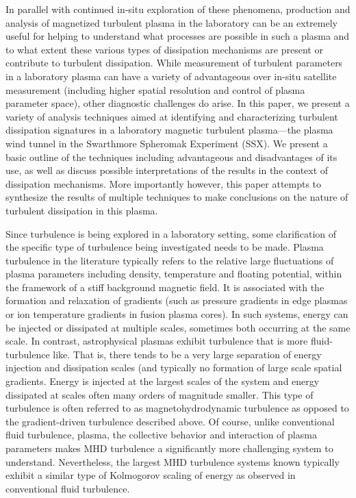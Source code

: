 \documentclass[aip,pop,amsmath,amssymb,reprint,superscriptaddress]{revtex4-1} %
\begin{document}
In parallel with continued in-situ exploration of these phenomena, production and analysis of magnetized turbulent plasma in the laboratory can be an extremely useful for helping to understand what processes are possible in such a plasma and to what extent these various types of dissipation mechanisms are present or contribute to turbulent dissipation. While measurement of turbulent parameters in a laboratory plasma can have a variety of advantageous over in-situ satellite measurement (including higher spatial resolution and control of plasma parameter space), other diagnostic challenges do arise.  In this paper, we present a variety of analysis techniques aimed at identifying and characterizing turbulent dissipation signatures in a laboratory magnetic turbulent plasma—the plasma wind tunnel in the Swarthmore Spheromak Experiment (SSX). We present a basic outline of the techniques including advantageous and disadvantages of its use, as well as discuss possible interpretations of the results in the context of dissipation mechanisms. More importantly however, this paper attempts to synthesize the results of multiple techniques to make conclusions on the nature of turbulent dissipation in this plasma.

Since turbulence is being explored in a laboratory setting, some clarification of the specific type of turbulence being investigated needs to be made. Plasma turbulence in the literature typically refers to the relative large fluctuations of plasma parameters including density, temperature and floating potential, within the framework of a stiff background magnetic field. It is associated with the formation and relaxation of gradients (such as pressure gradients in edge plasmas or ion temperature gradients in fusion plasma cores). In such systems, energy can be injected or dissipated at multiple scales, sometimes both occurring at the same scale. In contrast, astrophysical plasmas exhibit turbulence that is more fluid-turbulence like. That is, there tends to be a very large separation of energy injection and dissipation scales (and typically no formation of large scale spatial gradients. Energy is injected at the largest scales of the system and energy dissipated at scales often many orders of magnitude smaller. This type of turbulence is often referred to as magnetohydrodynamic turbulence as opposed to the gradient-driven turbulence described above. Of course, unlike conventional fluid turbulence, plasma, the collective behavior and interaction of plasma parameters makes MHD turbulence a significantly more challenging system to understand. Nevertheless, the largest MHD turbulence systems known typically exhibit a similar type of Kolmogorov scaling of energy as observed in conventional fluid turbulence. 
\end{document}
